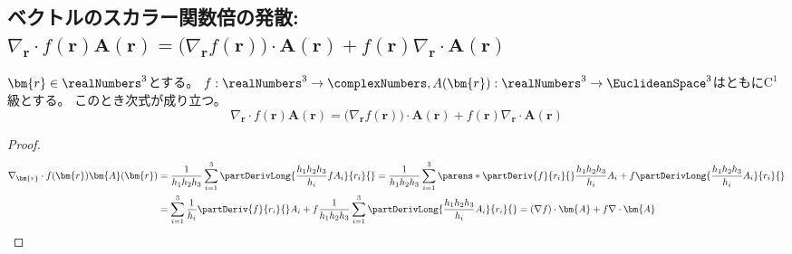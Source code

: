         \subsection{ベクトルのスカラー関数倍の発散\texorpdfstring{: $\nabla_\bm{r}\cdot f(\bm{r})\bm{A}(\bm{r}) = \bigl(\nabla_\bm{r}f(\bm{r})\bigr)\cdot \bm{A}(\bm{r}) + f(\bm{r})\nabla_\bm{r}\cdot\bm{A}(\bm{r})$}{}}
            \label{ベクトルのスカラー関数倍の発散}
            \begin{shadebox}
                $\bm{r}\in\realNumbers^3$とする。
                $f:\realNumbers^3\to\complexNumbers,A(\bm{r}):\realNumbers^3\to\EuclideanSpace^3$はともに$\mathrm{C}^1$級とする。
                このとき次式が成り立つ。
                \[ \nabla_\bm{r}\cdot f(\bm{r})\bm{A}(\bm{r}) = \bigl(\nabla_\bm{r}f(\bm{r})\bigr)\cdot \bm{A}(\bm{r}) + f(\bm{r})\nabla_\bm{r}\cdot\bm{A}(\bm{r}) \]
            \end{shadebox}
            \begin{proof}
                \begin{align*}
                    \nabla_\bm{r}\cdot f(\bm{r})\bm{A}(\bm{r}) &= \frac{1}{h_1 h_2 h_3}\sum_{i=1}^3 \partDerivLong{\frac{h_1 h_2 h_3}{h_i}f A_i}{r_i}{} = \frac{1}{h_1 h_2 h_3}\sum_{i=1}^3\parens*{\partDeriv{f}{r_i}{}\frac{h_1 h_2 h_3}{h_i} A_i + f\partDerivLong{\frac{h_1 h_2 h_3}{h_i} A_i}{r_i}{}} \\
                    &= \sum_{i=1}^3 \frac{1}{h_i}\partDeriv{f}{r_i}{}A_i + f\frac{1}{h_1 h_2 h_3}\sum_{i=1}^3 \partDerivLong{\frac{h_1 h_2 h_3}{h_i}A_i}{r_i}{} = (\nabla f)\cdot\bm{A} + f\nabla\cdot\bm{A}
                \end{align*}
            \end{proof}
